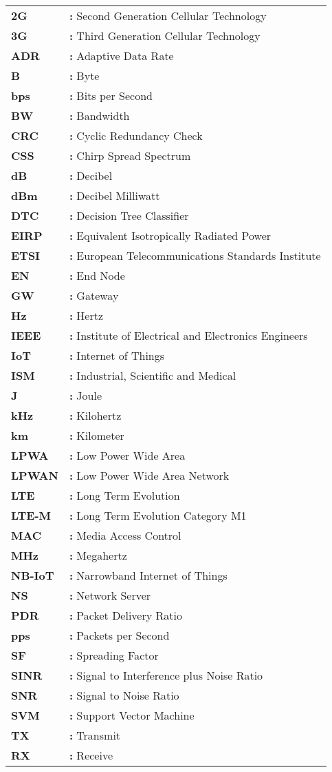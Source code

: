 \hspace{-3mm}
\begin{tabular}{p{2cm}l}
{\bf 2G} & {\bf:} Second Generation Cellular Technology\\
{\bf 3G} & {\bf:} Third Generation Cellular Technology\\
{\bf ADR} & {\bf:} Adaptive Data Rate\\
{\bf B} & {\bf:} Byte\\
{\bf bps} & {\bf:} Bits per Second\\
{\bf BW} & {\bf:} Bandwidth\\
{\bf CRC} & {\bf:} Cyclic Redundancy Check\\
{\bf CSS} & {\bf:} Chirp Spread Spectrum\\
{\bf dB} & {\bf:} Decibel\\
{\bf dBm} & {\bf:} Decibel Milliwatt\\
{\bf DTC} & {\bf:} Decision Tree Classifier\\
{\bf EIRP} & {\bf:} Equivalent Isotropically Radiated Power\\
{\bf ETSI} & {\bf:} European Telecommunications Standards Institute\\
{\bf EN} & {\bf:} End Node\\
{\bf GW} & {\bf:} Gateway\\
{\bf Hz} & {\bf:} Hertz\\
{\bf IEEE} & {\bf:} Institute of Electrical and Electronics Engineers\\
{\bf IoT} & {\bf:} Internet of Things\\
{\bf ISM} & {\bf:} Industrial, Scientific and Medical\\
{\bf J} & {\bf:} Joule\\
{\bf kHz} & {\bf:} Kilohertz\\
{\bf km} & {\bf:} Kilometer\\
{\bf LPWA} & {\bf:} Low Power Wide Area\\
{\bf LPWAN} & {\bf:} Low Power Wide Area Network\\
{\bf LTE} & {\bf:} Long Term Evolution\\
{\bf LTE-M} & {\bf:} Long Term Evolution Category M1\\
{\bf MAC} & {\bf:} Media Access Control\\
{\bf MHz} & {\bf:} Megahertz\\
{\bf NB-IoT} & {\bf:} Narrowband Internet of Things\\
{\bf NS} & {\bf:} Network Server\\
{\bf PDR} & {\bf:} Packet Delivery Ratio\\
{\bf pps} & {\bf:} Packets per Second\\
{\bf SF} & {\bf:} Spreading Factor\\
{\bf SINR} & {\bf:} Signal to Interference plus Noise Ratio\\
{\bf SNR} & {\bf:} Signal to Noise Ratio\\
{\bf SVM} & {\bf:} Support Vector Machine\\
{\bf TX} & {\bf:} Transmit\\
{\bf RX} & {\bf:} Receive\\
\end{tabular}
